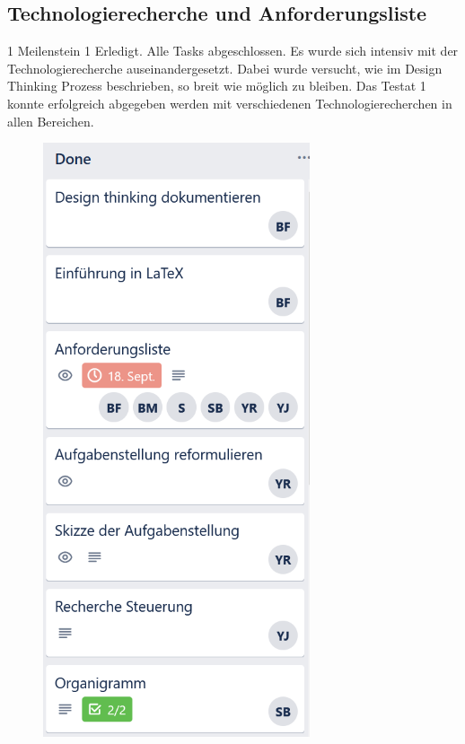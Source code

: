\subsection*{Technologierecherche und Anforderungsliste}
\workday
    {1}
    {\ok Meilenstein 1 Erledigt. Alle Tasks abgeschlossen.}
    {
      Es wurde sich intensiv mit der Technologierecherche auseinandergesetzt.
      Dabei wurde versucht, wie im Design Thinking Prozess beschrieben, so breit wie möglich
      zu bleiben.
    }
    {
      Das Testat 1 konnte erfolgreich abgegeben werden mit verschiedenen Technologierecherchen in
      allen Bereichen.
    }
    \begin{figure}[H]
  \centering
  \begin{minipage}[t]{0.45\linewidth}
  \includegraphics[width=0.7\textwidth]{img/Trello/Trello-Bord_1_Nr1.PNG}

\end{minipage}
\end{figure}
